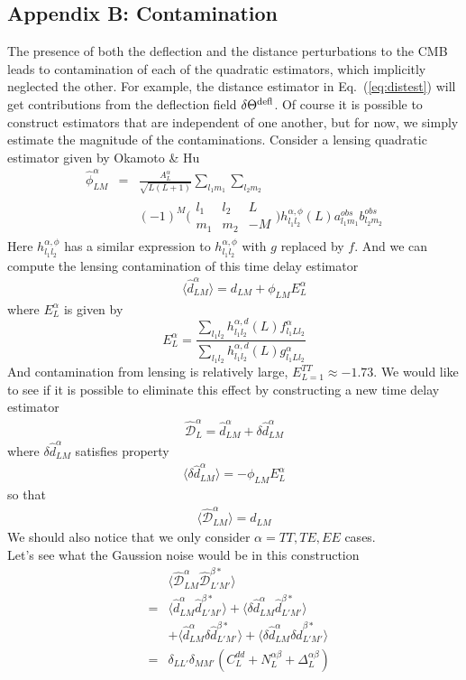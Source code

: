 \documentclass[prl,amsmath,amssymb,floatfix,superscriptaddress,nofootinbib,twocolumn]{revtex4-1}
\def\be{\begin{equation}}
\def\ee{\end{equation}}
\def\bea{\begin{eqnarray}}
\def\eea{\end{eqnarray}}
\newcommand{\ec}[1]{Eq.~(\ref{eq:#1})}
\begin{document}
\begin{appendices}
\section{Appendix B: Contamination}

The presence of both the deflection and the distance perturbations to the CMB leads to contamination of each of the quadratic estimators, which implicitly neglected the other. For example, the distance estimator in \ec{distest} will get contributions from the deflection field $\delta\Theta^{\rm defl}$. Of course it is possible to construct estimators that are independent of one another, but for now, we simply estimate the magnitude of the contaminations.
Consider a lensing quadratic estimator given by Okamoto \& Hu
\bea
\hat{\phi}^{\alpha}_{LM} &=&\nonumber \frac{A_{L}^{\alpha}}{\sqrt{L(L+1)}}\sum_{l_{1}m_{1}}\sum_{l_{2}m_{2}} \\
&& (-1)^{M}\bigl(\begin{smallmatrix} l_1 & l_2 & L \\ m_1 & m_2 & -M  \end{smallmatrix}\bigr) h^{\alpha,\phi}_{l_{1}l_{2}}(L) a^{obs}_{l_{1}m_{1}}b^{obs}_{l_{2}m_{2}}
\eea
Here $h^{\alpha,\phi}_{l_{1}l_{2}}$ has a similar expression to $h^{\alpha,\phi}_{l_{1}l_{2}}$ with $g$ replaced by $f$. And we can compute the lensing contamination of this time delay estimator
\bea
&& \langle \hat{d}^{\alpha}_{LM} \rangle = d_{LM} +\phi_{LM}E_{L}^{\alpha}
\eea
where $E^{\alpha}_{L}$ is given by
\be
E^{\alpha}_{L} = \frac{\sum_{l_{1}l_{2}}h_{l_{1}l_{2}}^{\alpha,d}(L)f_{l_{1}Ll_{2}}^{\alpha}}{\sum_{l_{1}l_{2}}h_{l_{1}l_{2}}^{\alpha,d}(L)g_{l_{1}Ll_{2}}^{\alpha}}
\ee
And contamination from lensing is relatively large, $E_{L=1}^{TT} \approx -1.73$. We would like to see if it is possible to eliminate this effect by constructing a new time delay estimator
\bea
\hat{\mathcal{D}}_{L}^{\alpha} = \hat{d}_{LM}^{\alpha}+\delta\hat{d}_{LM}^{\alpha}
\eea 
where $\delta\hat{d}_{LM}^{\alpha}$ satisfies property
\bea 
\langle \delta\hat{d}_{LM}^{\alpha} \rangle = - \phi_{LM}E_{L}^{\alpha}
\eea 
so that
\bea 
\langle \hat{\mathcal{D}}_{LM}^{\alpha} \rangle = d_{LM}
\eea 
We should also notice that we only consider $\alpha = TT, TE, EE$ cases. \\
Let's see what the Gaussion noise would be in this construction
\bea 
&&\langle \hat{\mathcal{D}}_{LM}^{\alpha}\hat{\mathcal{D}}_{L'M'}^{\beta*} \rangle \nonumber \\
&=&\langle \hat{d}_{LM}^{\alpha}\hat{d}_{L'M'}^{\beta*} \rangle + \langle \delta\hat{d}_{LM}^{\alpha}\hat{d}_{L'M'}^{\beta*} \rangle \nonumber \\
&&+\langle \hat{d}_{LM}^{\alpha}\delta\hat{d}_{L'M'}^{\beta*} \rangle + \langle \delta\hat{d}_{LM}^{\alpha}\delta\hat{d}_{L'M'}^{\beta*} \rangle \nonumber \\
&=&\delta_{LL'}\delta_{MM'}(C_{L}^{dd}+N_{L}^{\alpha\beta}+\Delta_{L}^{\alpha\beta})
\eea 
\end{appendices}


\end{document}
